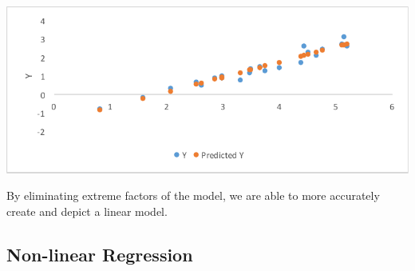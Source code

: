 \documentclass[10pt,letterpaper]{article}
\begin{document}
			\newline \newline
			\centerline{\includegraphics{Picture11.pdf}}
			\newline \newline
			By eliminating extreme factors of the model, we are able to more accurately create and depict a linear model. 
		\subsection{Non-linear Regression}
\end{document}

